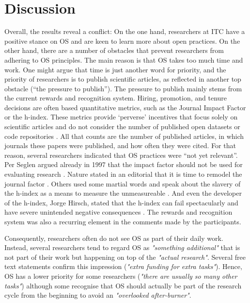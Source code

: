 \documentclass[gc, manuscript]{copernicus}
\begin{document}
\section{Discussion}

Overall, the results reveal a conflict: On the one hand, researchers at
ITC have a positive stance on OS and are keen to learn more about open
practices. On the other hand, there are a number of obstacles that
prevent researchers from adhering to OS principles. The main reason is
that OS takes too much time and work. One might argue that time is just
another word for priority, and the priority of researchers is to publish
scientific articles, as reflected in another top obstacle (``the
pressure to publish''). The pressure to publish mainly stems from the
current rewards and recognition system. Hiring, promotion, and tenure
decisions are often based quantitative metrics, such as the Journal
Impact Factor or the h-index. These metrics provide `perverse'
incentives that focus solely on scientific articles and do not consider
the number of published open datasets or code repositories
\citep{bouter2020research}. All that counts are the number of published
articles, in which journals these papers were published, and how often
they were cited. For that reason, several researchers indicated that OS
practices were ``not yet relevant''. Per Seglen argued already in 1997
that the impact factor should not be used for evaluating research
\citep{seglen1997impact}. Nature stated in an editorial that it is time
to remodel the journal factor \citep{natureedit2016}. Others used some
martial words and speak about the slavery of the h-index as a means to
measure the unmeasureable \citep{Kreiner_2016}. And even the developer
of the h-index, Jorge Hirsch, stated that the h-index can fail
spectacularly and have severe unintended negative consequences
\citep{conroy2020s}. The rewards and recognition system was also a
recurring element in the comments made by the participants.

Consequently, researchers often do not see OS as part of their daily
work. Instead, several researchers tend to regard OS as
\textit{"something additional"} that is not part of their work but
happening on top of the \textit{"actual research"}. Several free text
statements confirm this impression
(\textit{"extra funding for extra tasks"}). Hence, OS has a lower
priority for some researchers
(\textit{"there are usually so many other tasks"}) although some
recognise that OS should actually be part of the research cycle from the
beginning to avoid an \textit{"overlooked after-burner"}.
\end{document}
